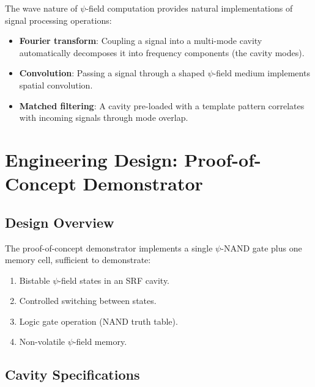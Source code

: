 \documentclass[12pt,a4paper,twoside]{article}
\begin{document}
The wave nature of $\psi$-field computation provides natural implementations of signal processing operations:
\begin{itemize}
\item \textbf{Fourier transform}: Coupling a signal into a multi-mode cavity automatically decomposes it into frequency components (the cavity modes).
\item \textbf{Convolution}: Passing a signal through a shaped $\psi$-field medium implements spatial convolution.
\item \textbf{Matched filtering}: A cavity pre-loaded with a template pattern correlates with incoming signals through mode overlap.
\end{itemize}

\section{Engineering Design: Proof-of-Concept Demonstrator}\label{sec:demonstrator}

\subsection{Design Overview}\label{sec:design_overview}

The proof-of-concept demonstrator implements a single $\psi$-NAND gate plus one memory cell, sufficient to demonstrate:
\begin{enumerate}
\item Bistable $\psi$-field states in an SRF cavity.
\item Controlled switching between states.
\item Logic gate operation (NAND truth table).
\item Non-volatile $\psi$-field memory.
\end{enumerate}

\subsection{Cavity Specifications}\label{sec:cavity_specs}
\end{document}

